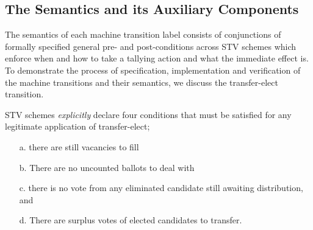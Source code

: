 \documentclass[10pt,conference]{IEEEtran}
\begin{document}
\subsection{The Semantics and its Auxiliary Components}
\label{sec:MachineSem}


The semantics of each machine transition label consists of conjunctions of formally specified general pre- and post-conditions across STV schemes which enforce when and how to take a tallying action and what the immediate effect is. To demonstrate the process of specification, implementation and verification of the machine transitions and their semantics, we discuss the transfer-elect transition.


STV schemes \emph{explicitly} declare four conditions that must be satisfied  for any legitimate application of transfer-elect; 
\begin{itemize}
\item[a.] there are still vacancies to fill
\item[b.] There are no uncounted ballots to deal with
\item[c.] there is no vote from any eliminated candidate still awaiting distribution, and
\item[d.] There are surplus votes of elected candidates to  transfer.
\end{itemize}
\end{document}
